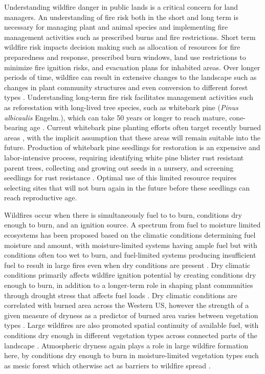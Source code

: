 \documentclass[11pt]{article}
\begin{document}
Understanding wildfire danger in public lands is a critical concern for land managers.  An understanding of fire risk both in the short and long term is necessary for managing plant and animal species and implementing fire management activities such as prescribed burns and fire restrictions. Short term wildfire risk impacts decision making such as allocation of resources for fire preparedness and response, prescribed burn windows, land use restrictions to minimize fire ignition risks, and evacuation plans for inhabited areas.  Over longer periods of time, wildfire can result in extensive changes to the landscape such as changes in plant community structures and even conversion to different forest types \citep{coopWildfireDrivenForestConversion2020}. Understanding long-term fire risk facilitates management activities such as reforestation with long-lived tree species, such as whitebark pine (\textit{Pinus albicaulis} Engelm.), which can take 50 years or longer to reach mature, cone-bearing age \citep{tombackWhitebarkPineCommunities2001}. Current whitebark pine planting efforts often target recently burned areas \citep{keaneRangewideRestorationStrategy2012}, with the implicit assumption that these areas will remain suitable into the future. Production of whitebark pine seedlings for restoration is an expensive and labor-intensive process, requiring identifying white pine blister rust resistant parent trees, collecting and growing out seeds in a nursery, and screening seedlings for rust resistance \citep{tombackTammReviewCurrent2022}.  Optimal use of this limited resource requires selecting sites that will not burn again in the future before these seedlings can reach reproductive age. 

Wildfires occur when there is simultaneously fuel to to burn, conditions dry enough to burn, and an ignition source. A spectrum from fuel to moisture limited ecosystems has been proposed based on the climatic conditions determining fuel moisture and amount, with moisture-limited systems having ample fuel but with conditions often too wet to burn, and fuel-limited systems producing insufficient fuel to result in large fires even when dry conditions are present \citep{meynEnvironmentalDriversLarge2007}. Dry climatic conditions primarily affects wildfire ignition potential by creating conditions dry enough to burn, in addition to a longer-term role in shaping plant communities through drought stress that affects fuel loads \citep{littellReviewRelationshipsDrought2016}. Dry climatic conditions are correlated with burned area across the Western US, however the strength of a given measure of dryness as a predictor of burned area varies between vegetation types \citep{littellClimateWildfireArea2009}. Large wildfires are also promoted spatial continuity of available fuel, with conditions dry enough in different vegetation types across connected parts of the landscape \citep{millerConnectivityForestFuels2000}. Atmospheric dryness again plays a role in large wildfire formation here, by conditions dry enough to burn in moisture-limited vegetation types such as mesic forest which otherwise act as barriers to wildfire spread \citep{cawsonAtmosphericDrynessRemoves2024}.
\end{document}
